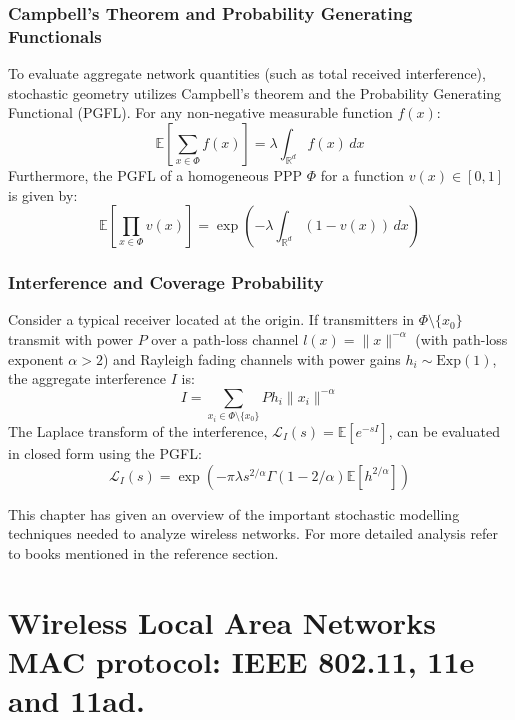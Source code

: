 \subsection{Campbell's Theorem and Probability Generating Functionals}
To evaluate aggregate network quantities (such as total received interference), stochastic geometry utilizes Campbell's theorem and the Probability Generating Functional (PGFL). For any non-negative measurable function $f(x)$:
\begin{equation}
    \mathbb{E}\left[\sum_{x \in \Phi} f(x)\right] = \lambda \int_{\mathbb{R}^d} f(x) \, dx
\end{equation}
Furthermore, the PGFL of a homogeneous PPP $\Phi$ for a function $v(x) \in [0, 1]$ is given by:
\begin{equation}
    \mathbb{E}\left[\prod_{x \in \Phi} v(x)\right] = \exp\left(-\lambda \int_{\mathbb{R}^d} (1 - v(x)) \, dx\right)
\end{equation}

\subsection{Interference and Coverage Probability}
Consider a typical receiver located at the origin. If transmitters in $\Phi \setminus \{x_0\}$ transmit with power $P$ over a path-loss channel $l(x) = \|x\|^{-\alpha}$ (with path-loss exponent $\alpha > 2$) and Rayleigh fading channels with power gains $h_i \sim \text{Exp}(1)$, the aggregate interference $I$ is:
\begin{equation}
    I = \sum_{x_i \in \Phi \setminus \{x_0\}} P h_i \|x_i\|^{-\alpha}
\end{equation}
The Laplace transform of the interference, $\mathcal{L}_I(s) = \mathbb{E}[e^{-sI}]$, can be evaluated in closed form using the PGFL:
\begin{equation}
    \mathcal{L}_I(s) = \exp\left(-\pi \lambda s^{2/\alpha} \Gamma(1 - 2/\alpha) \mathbb{E}[h^{2/\alpha}]\right)
\end{equation}

This chapter has given an overview of the important stochastic modelling techniques needed to analyze wireless networks. For more detailed analysis refer to books mentioned in the reference section.
\chapter{Wireless Local Area Networks MAC protocol: IEEE 802.11, 11e and 11ad.}
\label{sec:chapter_wlan}

